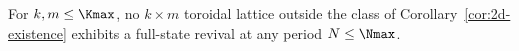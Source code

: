 \begin{corollary}
\label{cor:2d-nonexistence}
For $k, m \le \Kmax$, no $k \times m$ toroidal lattice
outside the class of Corollary~\ref{cor:2d-existence}
exhibits a full-state revival at any period $N \le \Nmax$.
\end{corollary}
